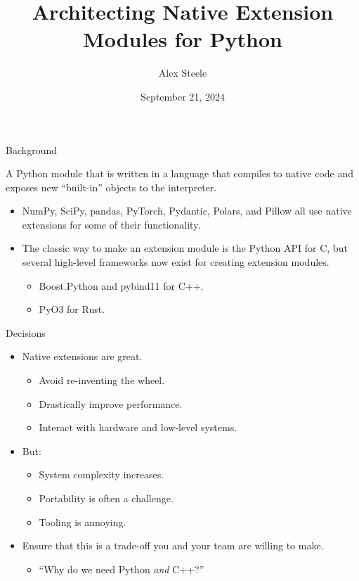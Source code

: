 \documentclass[8pt, aspectratio=169]{beamer}
\title{Architecting Native Extension Modules for Python}
\author{Alex Steele}
\date{September 21, 2024}
\institute{PyBay 2024}
\begin{document}
\maketitle

\begin{frame}{Background}
\begin{definition}
A Python module that is written in a language that compiles to native code and exposes new ``built-in'' objects to the interpreter.
\end{definition}
\begin{itemize}
\item NumPy, SciPy, pandas, PyTorch, Pydantic, Polars, and Pillow all use native extensions for some of their functionality.
\item The classic way to make an extension module is the Python API for C, but several high-level frameworks now exist for creating extension modules.
\begin{itemize}
\item Boost.Python and pybind11 for C++.
\item PyO3 for Rust.
\end{itemize}
\end{itemize}
\end{frame}

\begin{frame}{Decisions}
\begin{itemize}
\item Native extensions are great.
\begin{itemize}
\item Avoid re-inventing the wheel.
\item Drastically improve performance.
\item Interact with hardware and low-level systems.
\end{itemize}
\item But:
\begin{itemize}
\item System complexity increases.
\item Portability is often a challenge.
\item Tooling is annoying.
\end{itemize}
\item Ensure that this is a trade-off you and your team are willing to make.
\begin{itemize}
\item ``Why do we need Python \emph{and} C++?''
\end{itemize}
\end{itemize}
\end{frame}
\end{document}

